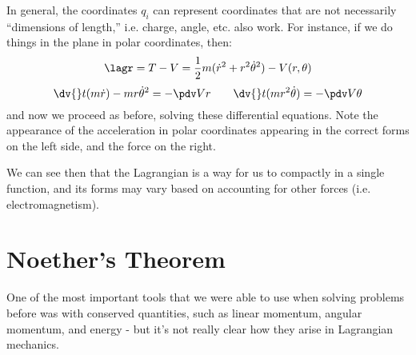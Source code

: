 \documentclass[12pt]{article}
\begin{document}
In general, the coordinates $q_i$ can represent coordinates that are not
necessarily ``dimensions of length,'' i.e. charge, angle, etc. also work. For
instance, if we do things in the plane in polar coordinates, then: 
\[
  \lagr = T - V = \frac{1}{2} m (\dot r^2 + r^2 \dot \theta^2) - V(r, \theta) 
\] 
\[
  \dv{} t (m \dot r) - mr \dot \theta^2 = - \pdv V r \qquad \dv{}t (mr^2 \dot
  \theta) = - \pdv V \theta 
\] 
and now we proceed as before, solving these differential equations. Note the
appearance of the acceleration in polar coordinates appearing in the correct
forms on the left side, and the force on the right. 

We can see then that the Lagrangian is a way for us to 
compactly in a single function, and its forms may vary based on accounting for
other forces (i.e. electromagnetism).

\section{Noether's Theorem}
One of the most important tools that we were able to use when solving problems before was with conserved quantities, such as linear momentum, angular momentum, and energy - but it's not really clear how they arise in Lagrangian mechanics. 
\end{document}
